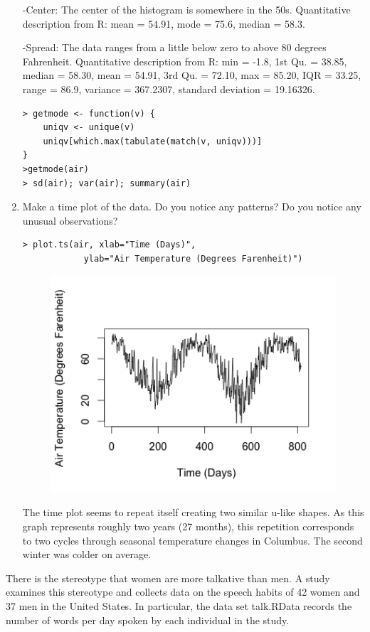 \documentclass[12pt]{article}
\newenvironment{question}[2][Question]{\begin{trivlist}
\item[\hskip \labelsep {\bfseries #1}\hskip \labelsep {\bfseries #2.}]}{\end{trivlist}}
\begin{document}
\begin{enumerate}[label=(\alph*)]
-Center: The center of the histogram is somewhere in the 50s. Quantitative description from R: mean = 54.91, mode =  75.6, median = 58.3.

-Spread: The data ranges from a little below zero to above 80 degrees Fahrenheit. Quantitative description from R: min = -1.8, 1st Qu. = 38.85, median = 58.30, mean = 54.91, 3rd Qu. = 72.10, max = 85.20, IQR = 33.25, range = 86.9, variance = 367.2307, standard deviation = 19.16326. 


\begin{lstlisting}
> getmode <- function(v) {
    uniqv <- unique(v)
    uniqv[which.max(tabulate(match(v, uniqv)))]
}
>getmode(air)
> sd(air); var(air); summary(air)
\end{lstlisting}


\item Make a time plot of the data. Do you notice any patterns? Do you notice any unusual observations?
\begin{lstlisting}
> plot.ts(air, xlab="Time (Days)", 
			ylab="Air Temperature (Degrees Farenheit)")
\end{lstlisting}

\begin{figure}[h!]
\centering
\includegraphics{timePlot.png}
\end{figure}

The time plot seems to repeat itself creating two similar u-like shapes. As this graph represents roughly two years (27 months), this repetition corresponds to two cycles through seasonal temperature changes in Columbus. The second winter was colder on average. 
\end{enumerate}


\begin{question}{2}
There is the stereotype that women are more talkative than men. A study examines this stereotype and collects data on the speech habits of 42 women and 37 men in the United States. In particular, the data set talk.RData records the number of words per day spoken by each individual in the study.
\end{question}
\end{document}
